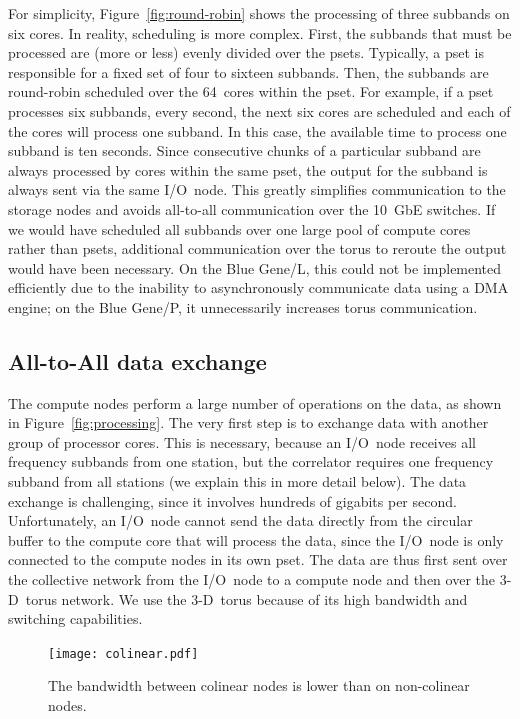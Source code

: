 \documentclass{sig-alternate}
\begin{document}
For simplicity, Figure~\ref{fig:round-robin} shows the processing of
three subbands on six cores.
In reality, scheduling is more complex.
First, the subbands that must be processed are (more or less) evenly divided
over the psets.
Typically, a pset is responsible for a fixed set of four to sixteen subbands.
Then, the subbands are round-robin scheduled over the 64~cores within the
pset.
For example, if a pset processes six subbands, every second, the next six
cores are scheduled and each of the cores will process one subband.
In this case, the available time to process one subband is ten seconds.
Since consecutive chunks of a particular subband are always processed by cores
within the same pset, the output for the subband is always sent via the same
I/O~node.
This greatly simplifies communication to the storage nodes and avoids
all-to-all communication over the 10~GbE switches.
If we would have scheduled all subbands over one large pool of compute cores
rather than psets, additional communication over the torus to reroute the
output would have been necessary.
On the Blue Gene/L, this could not be implemented efficiently due to the
inability to asynchronously communicate data using a DMA engine; on the
Blue Gene/P, it unnecessarily increases torus communication.


\subsection{All-to-All data exchange}

The compute nodes perform a large number of operations on the data, as shown in
Figure~\ref{fig:processing}.
The very first step is to exchange data with another group of processor cores.
This is necessary, because an I/O~node receives all frequency subbands from one
station, but the correlator requires one frequency subband from all
stations (we explain this in more detail below).
The data exchange is challenging, since it involves hundreds of gigabits per
second.
Unfortunately, an I/O~node cannot send the data directly from the circular
buffer to the compute core that will process the data, since the I/O~node is
only connected to the compute nodes in its own pset.
The data are thus first sent over the collective network from the I/O~node to
a compute node and then over the 3-D~torus network.
We use the 3-D~torus because of its high bandwidth and switching capabilities.

\begin{figure}
\begin{center}
\texttt{[image: colinear.pdf]}
\end{center}
\caption{The bandwidth between colinear nodes is lower than on non-colinear nodes.}
\label{fig:colinear}
\end{figure}
\end{document}
